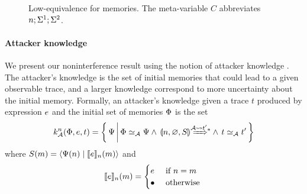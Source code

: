 \begin{figure}
    \centering
    \caption{Low-equivalence for memories. The meta-variable $C$ abbreviates $n; \Sigma^1; \Sigma^2$.}
    \label{fig:low-eq-memories}
\end{figure}

\paragraph{Attacker knowledge}
We present our noninterference result using the notion of attacker knowledge \cite{Askarov:2008:TNL:1462455.1462485, 4223226}. The attacker's knowledge is the set of initial memories that could lead to a given observable trace, and a larger knowledge correspond to more uncertainty about the initial memory. Formally, an attacker's knowledge given a trace $t$ produced by expression $e$ and the initial set of memories $\Phi$ is the set
\begin{equation*}
k^n_{\Attacker}(\globalstore, \expr, t) = \left\{ \, \altglobalstore \, \middle\vert \, \globalstore \simeq_{\Attacker} \altglobalstore \wedge \, \gconfig{n}{\emptyenv}{S} \gstepstos[][\Attacker \filtertrace t'] \wedge \, t \simeq_{\Attacker} t' \, \right\}
\end{equation*}
where $S(m) = \langle \Psi(n) \mid \llbracket e \rrbracket_n(m) \rangle$ and
\begin{equation*}
\llbracket e \rrbracket_n(m) =
\begin{cases}
e & \text{ if } n = m\\
\bullet & \text{ otherwise }
\end{cases}
\end{equation*}

